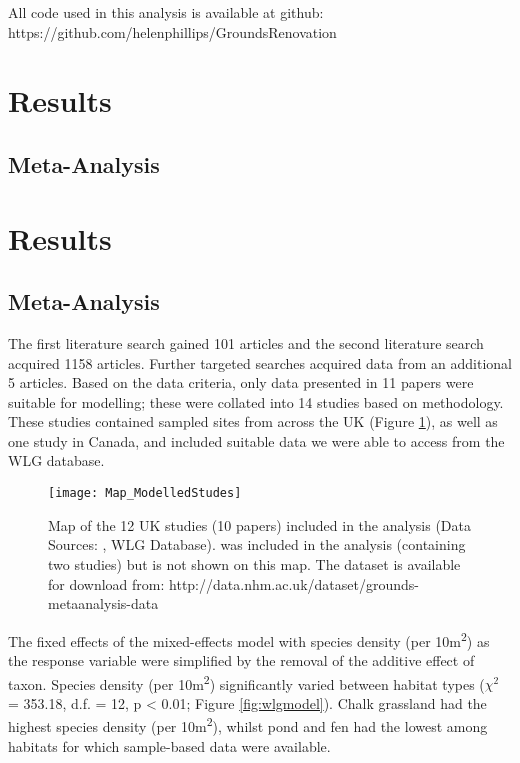 All code used in this analysis is available at github: https://github.com/helenphillips/GroundsRenovation

\ifappendixStyle %
\section{Results}
\subsection{Meta-Analysis}%
\else
\section*{Results}
\subsection*{Meta-Analysis}
\fi

The first literature search gained 101 articles and the second literature search acquired 1158 articles. Further targeted searches acquired data from an additional 5 articles. Based on the data criteria, only data presented in 11 papers were suitable for modelling; these were collated into 14 studies based on methodology. These studies contained sampled sites from across the UK (Figure \ref{fig:wlgmap}), as well as one study in Canada, and included suitable data we were able to access from the WLG database.

\begin{figure}[t]
	\centering
	\texttt{[image: Map\_ModelledStudes]}
	\caption{Map of the 12 UK studies (10 papers) included in the analysis (Data Sources: \cite{Petit:1998bc,Wilson:2003aee,Fountain:2004et,Smith:2006ue,Butt:2008ejsb,Williams:2008hb,Scriven:2013ije,Sirohi:2015jic,Speak:2015ufug}, WLG Database). \cite{Macivor:2011ue} was included in the analysis (containing two studies) but is not shown on this map. The dataset is available for download from: http://data.nhm.ac.uk/dataset/grounds-metaanalysis-data}
   	 \label{fig:wlgmap}
\end{figure}

The fixed effects of the mixed-effects model with species density (per 10m\textsuperscript{2}) as the response variable were simplified by the removal of the additive effect of taxon. Species density (per 10m\textsuperscript{2}) significantly varied between habitat types ($\chi^2$ = 353.18, d.f. = 12, p < 0.01; Figure \ref{fig:wlgmodel}). Chalk grassland had the highest species density (per 10m\textsuperscript{2}), whilst pond and fen had the lowest among habitats for which sample-based data were available. 

